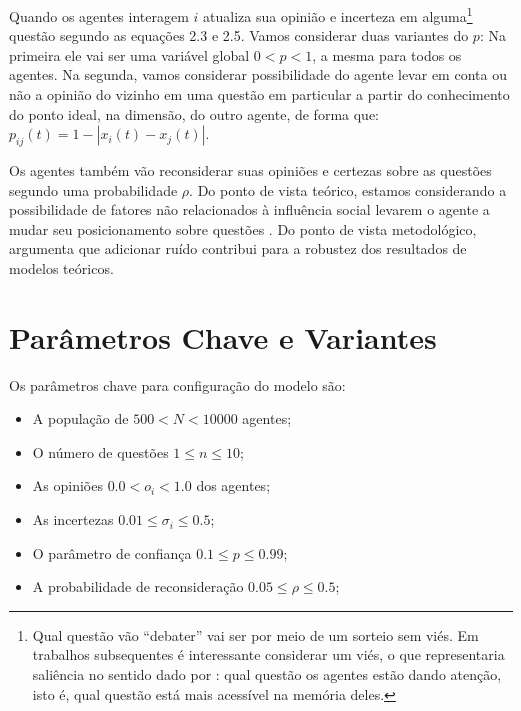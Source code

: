 Quando os agentes interagem \(i\) atualiza sua opinião e incerteza em
alguma\footnote{Qual questão vão ``debater'' vai ser por meio de um sorteio sem
viés. Em trabalhos subsequentes é interessante considerar um viés, o que
representaria saliência no sentido dado por : qual
questão os agentes estão dando atenção, isto é, qual questão está mais acessível
na memória deles.} questão segundo as equações 2.3 e 2.5. Vamos considerar duas
variantes do \(p\): Na primeira ele vai ser uma variável global \(0 < p < 1 \),
a mesma para todos os agentes. Na segunda, vamos considerar possibilidade do
agente levar em conta ou não a opinião do vizinho em uma questão em particular a
partir do conhecimento do ponto ideal, na dimensão, do outro agente, de forma
que: \(p_{ij}(t) = 1 - |x_i(t) - x_j(t)|\).

Os agentes também vão reconsiderar suas opiniões e certezas sobre as questões
segundo uma probabilidade \(\rho\). Do ponto de vista teórico, estamos considerando
a possibilidade de fatores não relacionados à influência social levarem o agente
a mudar seu posicionamento sobre questões \cite{flache2017, lorenz2017modeling}.
Do ponto de vista metodológico,  argumenta que
adicionar ruído contribui para a robustez dos resultados de modelos teóricos.

\section{Parâmetros Chave e Variantes}

Os parâmetros chave para configuração do modelo são:
\begin{itemize}
\item A população de \(500 < N < 10000\) agentes;
\item O número de questões \(1 \leq n \leq 10\); 
\item As opiniões \(0.0< o_i< 1.0\) dos agentes;
\item As incertezas \(0.01 \leq \sigma_i \leq 0.5\); 
\item O parâmetro de confiança \(0.1 \leq p \leq 0.99\); 
\item A probabilidade de reconsideração \(0.05 \leq \rho  \leq 0.5\);
\end{itemize}

















